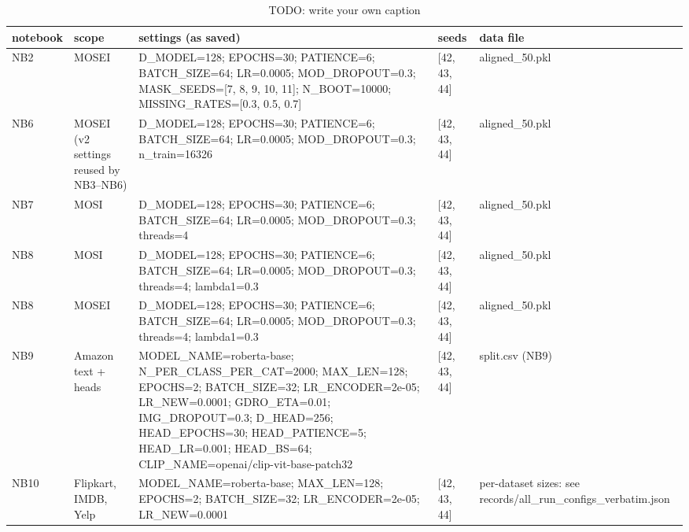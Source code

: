 \begin{table}[h]
\caption{TODO: write your own caption}\label{tab:R03-hyperparameters}
\scriptsize
\begin{tabularx}{\textwidth}{l>{\raggedright\arraybackslash}X>{\raggedright\arraybackslash}Xl>{\raggedright\arraybackslash}X}
\toprule
notebook & scope & settings (as saved) & seeds & data file \\
\midrule
NB2 & MOSEI & D\_\allowbreak{}MODEL=128; EPOCHS=30; PATIENCE=6; BATCH\_\allowbreak{}SIZE=64; LR=0.0005; MOD\_\allowbreak{}DROPOUT=0.3; MASK\_\allowbreak{}SEEDS=[7, 8, 9, 10, 11]; N\_\allowbreak{}BOOT=10000; MISSING\_\allowbreak{}RATES=[0.3, 0.5, 0.7] & [42, 43, 44] & aligned\_\allowbreak{}50.pkl \\
NB6 & MOSEI (v2 settings reused by NB3--NB6) & D\_\allowbreak{}MODEL=128; EPOCHS=30; PATIENCE=6; BATCH\_\allowbreak{}SIZE=64; LR=0.0005; MOD\_\allowbreak{}DROPOUT=0.3; n\_\allowbreak{}train=16326 & [42, 43, 44] & aligned\_\allowbreak{}50.pkl \\
NB7 & MOSI & D\_\allowbreak{}MODEL=128; EPOCHS=30; PATIENCE=6; BATCH\_\allowbreak{}SIZE=64; LR=0.0005; MOD\_\allowbreak{}DROPOUT=0.3; threads=4 & [42, 43, 44] & aligned\_\allowbreak{}50.pkl \\
NB8 & MOSI & D\_\allowbreak{}MODEL=128; EPOCHS=30; PATIENCE=6; BATCH\_\allowbreak{}SIZE=64; LR=0.0005; MOD\_\allowbreak{}DROPOUT=0.3; threads=4; lambda1=0.3 & [42, 43, 44] & aligned\_\allowbreak{}50.pkl \\
NB8 & MOSEI & D\_\allowbreak{}MODEL=128; EPOCHS=30; PATIENCE=6; BATCH\_\allowbreak{}SIZE=64; LR=0.0005; MOD\_\allowbreak{}DROPOUT=0.3; threads=4; lambda1=0.3 & [42, 43, 44] & aligned\_\allowbreak{}50.pkl \\
NB9 & Amazon text + heads & MODEL\_\allowbreak{}NAME=roberta-base; N\_\allowbreak{}PER\_\allowbreak{}CLASS\_\allowbreak{}PER\_\allowbreak{}CAT=2000; MAX\_\allowbreak{}LEN=128; EPOCHS=2; BATCH\_\allowbreak{}SIZE=32; LR\_\allowbreak{}ENCODER=2e-05; LR\_\allowbreak{}NEW=0.0001; GDRO\_\allowbreak{}ETA=0.01; IMG\_\allowbreak{}DROPOUT=0.3; D\_\allowbreak{}HEAD=256; HEAD\_\allowbreak{}EPOCHS=30; HEAD\_\allowbreak{}PATIENCE=5; HEAD\_\allowbreak{}LR=0.001; HEAD\_\allowbreak{}BS=64; CLIP\_\allowbreak{}NAME=openai/\allowbreak{}clip-vit-base-patch32 & [42, 43, 44] & split.csv (NB9) \\
NB10 & Flipkart, IMDB, Yelp & MODEL\_\allowbreak{}NAME=roberta-base; MAX\_\allowbreak{}LEN=128; EPOCHS=2; BATCH\_\allowbreak{}SIZE=32; LR\_\allowbreak{}ENCODER=2e-05; LR\_\allowbreak{}NEW=0.0001 & [42, 43, 44] & per-dataset sizes: see records/\allowbreak{}all\_\allowbreak{}run\_\allowbreak{}configs\_\allowbreak{}verbatim.json \\
\bottomrule
\end{tabularx}
\par{}
\end{table}
